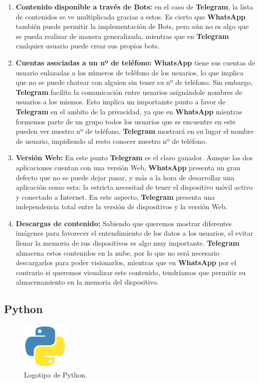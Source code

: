 \begin{enumerate}
	\item \textbf{Contenido disponible a través de Bots:} en el caso de \textbf{Telegram}, la lista de contenidos se ve multiplicada gracias a estos. Es cierto que \textbf{WhatsApp} también puede permitir la implementación de Bots, pero aún no es algo que se pueda realizar de manera generalizada, mientras que en \textbf{Telegram} cualquier usuario puede crear sus propios bots.
	\item \textbf{Cuentas asociadas a un nº de teléfono:} \textbf{WhatsApp} tiene sus cuentas de usuario enlazadas a los números de teléfono de los usuarios, lo que implica que no se puede chatear con alguien sin tener su nº de teléfono. Sin embargo, \textbf{Telegram} facilita la comunicación entre usuarios asignándole nombres de usuarios a los mismos. Esto implica un importamte punto a favor de \textbf{Telegram} en el ambito de la privacidad, ya que en \textbf{WhatsApp} mientras formemos parte de un grupo todos los usuarios que se encuentre en este pueden ver nuestro nº de teléfono, \textbf{Telegram} mostrará en su lugar el nombre de usuario, impidiendo al resto conocer nuestro nº de teléfono.
	\item \textbf{Versión Web:} En este punto \textbf{Telegram} es el claro ganador. Aunque las dos aplicaciones cuentan con una versión Web, \textbf{WhatsApp} presenta un gran defecto que no se puede dejar pasar, y más a la hora de desarrollar una aplicación como esta: la estricta necesitad de tener el dispositivo móvil activo y conectado a Internet. En este aspecto, \textbf{Telegram} presenta una independencia total entre la versión de dispositivos y la versión Web.
	\item \textbf{Descargas de contenido:} Sabiendo que queremos mostrar diferentes imágenes para favorecer el entendimiento de los datos a los usuarios, el evitar llenar la memoria de sus dispositivos es algo muy importante. \textbf{Telegram} almacena estos contenidos en la nube, por lo que no será necesario descargarlos para poder visionarlos, mientras que en \textbf{WhatsApp} por el contrario si queremos visualizar este contenido, tendríamos que permitir su almacenamiento en la memoria del dispositivo.
\end{enumerate}

\subsection{Python}

\begin{figure}[H]
	\centering
	\includegraphics[width=0.2\textwidth]{img/python-icon}
	\caption{Logotipo de Python.}
\end{figure}

